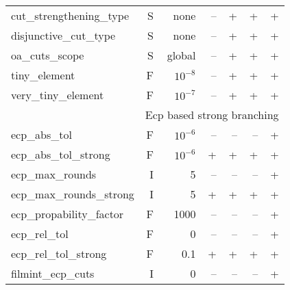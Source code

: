 \begin{center}
\begin{tabular}{|l|r|r|r|r|r|r|}
cut\_strengthening\_type& S& none& --& +& +& +\\
disjunctive\_cut\_type& S& none& --& +& +& +\\
oa\_cuts\_scope& S& global& --& +& +& +\\
tiny\_element& F& $10^{-8}$& --& +& +& +\\
very\_tiny\_element& F& $10^{-7}$& --& +& +& +\\
\hline
\multicolumn{1}{|c}{} & \multicolumn{6}{l|}{Ecp based strong branching}\\
\hline
ecp\_abs\_tol& F& $10^{-6}$& --& --& --& +\\
ecp\_abs\_tol\_strong& F& $10^{-6}$& +& +& +& +\\
ecp\_max\_rounds& I& 5& --& --& --& +\\
ecp\_max\_rounds\_strong& I& 5& +& +& +& +\\
ecp\_propability\_factor& F& 1000& --& --& --& +\\
ecp\_rel\_tol& F& 0& --& --& --& +\\
ecp\_rel\_tol\_strong& F& 0.1& +& +& +& +\\
filmint\_ecp\_cuts& I& 0& --& --& --& +\\
\hline
\end{tabular}


\end{center}
